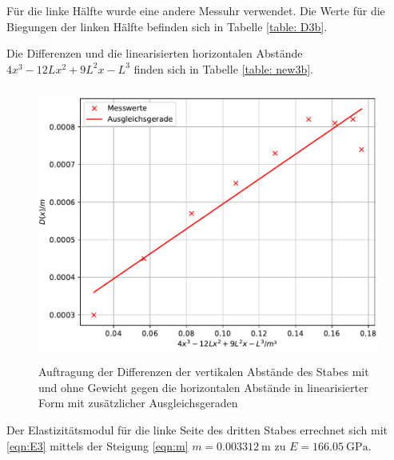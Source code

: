 \noindent Für die linke Hälfte wurde eine andere Messuhr verwendet.
Die Werte für die Biegungen der linken Hälfte befinden sich in Tabelle \ref{table: D3b}.

\noindent Die Differenzen und die linearisierten horizontalen Abstände
$4x^3-12Lx^2+9L^2x-L^3$ finden sich in Tabelle \ref{table: new3b}.

\begin{figure}

  \centering
  \includegraphics[width=12cm, height=9cm]{./plots/Stange3b.pdf}
  \caption{Auftragung der Differenzen der vertikalen Abstände des Stabes mit und ohne Gewicht gegen die horizontalen Abstände in linearisierter Form mit zusätzlicher Ausgleichsgeraden}
  \label{fig:plot3b}
\end{figure}
\noindent Der Elastizitätsmodul für die linke Seite des dritten Stabes
errechnet sich mit \eqref{eqn:E3} 
mittels der Steigung \eqref{eqn:m} 
$m =\SI{0.003312}{\meter}$ zu $E = \SI{166.05}{\giga\pascal}$.
